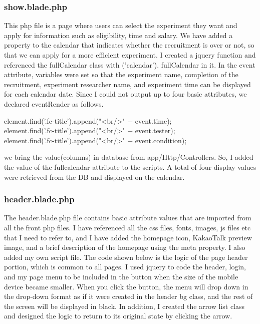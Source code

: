 \documentclass[letterpaper, 10 pt, conference]{ieeeconf}  %
\begin{document}
\subsubsection{show.blade.php}
This php file is a page where users can select the experiment they want and apply for information such as eligibility, time and salary. We have added a property to the calendar that indicates whether the recruitment is over or not, so that we can apply for a more efficient experiment. I created a jquery function and referenced the fullCalendar class with  ('calendar'). fullCalendar in it. In the event attribute, variables were set so that the experiment name, completion of the recruitment, experiment researcher name, and experiment time can be displayed for each calendar date. Since I could not output up to four basic attributes, we declared eventRender as follows.\\
element.find('.fc-title').append("<br/>" + event.time);\\
element.find('.fc-title').append("<br/>" + event.tester); \\
element.find('.fc-title').append("<br/>" + event.condition);\\
we bring the value(columns) in database from  app/Http/Controllers. So, I added the value of the fullcalendar attribute to the scripts. A total of four display values were retrieved from the DB and displayed on the calendar.\\
\subsubsection{header.blade.php}
The header.blade.php file contains basic attribute values that are imported from all the front php files. I have referenced all the css files, fonts, images, js files etc that I need to refer to, and I have added the homepage icon, KakaoTalk preview image, and a brief description of the homepage using the meta property. I also added my own script file. The code shown below is the logic of the page header portion, which is common to all pages. I used jquery to code the header, login, and my page menu to be included in the button when the size of the mobile device became smaller. When you click the button, the menu will drop down in the drop-down format as if it were created in the header bg class, and the rest of the screen will be displayed in black.
In addition, I created the arrow list class and designed the logic to return to its original state by clicking the arrow.\\
\end{document}
